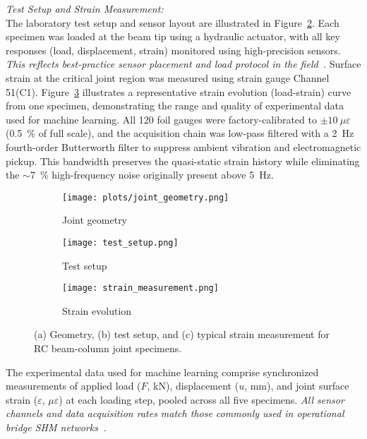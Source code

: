 \documentclass{article}
\begin{document}
\emph{Test Setup and Strain Measurement:} \\
The laboratory test setup and sensor layout are illustrated in Figure~\ref{fig:test_setup}. Each specimen was loaded at the beam tip using a hydraulic actuator, with all key responses (load, displacement, strain) monitored using high-precision sensors. \emph{This reflects best-practice sensor placement and load protocol in the field~\cite{Smarsly2023DigitalTwin, Yang2023}.}
Surface strain at the critical joint region was measured using strain gauge Channel 51(C1). Figure~\ref{fig:exp_setup_and_strain} illustrates a representative strain evolution (load-strain) curve from one specimen, demonstrating the range and quality of experimental data used for machine learning. 
All 120 foil gauges were factory-calibrated to $\pm10~\mu\varepsilon$ (0.5~\% of full scale),
and the acquisition chain was low-pass filtered with a 2~Hz fourth-order
Butterworth filter to suppress ambient vibration and electromagnetic pickup.
This bandwidth preserves the quasi-static strain history while eliminating the
$\sim$7~\% high-frequency noise originally present above 5~Hz.

\begin{figure}[H]
    \centering
    \begin{subfigure}[b]{0.31\textwidth}
        \texttt{[image: plots/joint\_geometry.png]}
        \caption{Joint geometry}
        \label{fig:joint_geometry}
    \end{subfigure}
    \hfill
    \begin{subfigure}[b]{0.31\textwidth}
        \texttt{[image: test\_setup.png]}
        \caption{Test setup}
        \label{fig:test_setup}
    \end{subfigure}
    \hfill
    \begin{subfigure}[b]{0.31\textwidth}
        \texttt{[image: strain\_measurement.png]}
        \caption{Strain evolution}
        \label{fig:exp_setup_and_strain}
    \end{subfigure}
    \caption{(a) Geometry, (b) test setup, and (c) typical strain measurement for RC beam-column joint specimens.}
    \label{fig:three_exp_figs}
\end{figure}

The experimental data used for machine learning comprise synchronized measurements of applied load ($F$, kN), displacement ($u$, mm), and joint surface strain ($\varepsilon$, $\mu\varepsilon$) at each loading step, pooled across all five specimens. \emph{All sensor channels and data acquisition rates match those commonly used in operational bridge SHM networks~\cite{Smarsly2023DigitalTwin}.}
\end{document}
